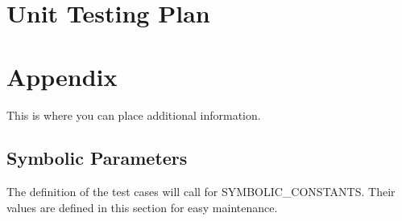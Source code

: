 \documentclass[12pt, titlepage]{article}
\begin{document}


					
					
					
					
					

					
					
					
					



				
\section{Unit Testing Plan}
		





\newpage

\section{Appendix}

This is where you can place additional information.

\subsection{Symbolic Parameters}

The definition of the test cases will call for SYMBOLIC\_CONSTANTS.
Their values are defined in this section for easy maintenance.
\end{document}
